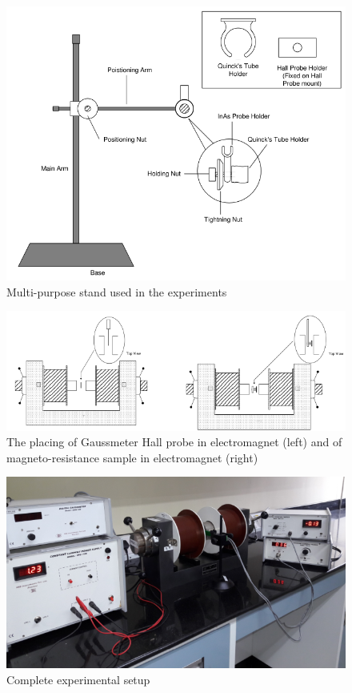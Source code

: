 \documentclass[%
 aip,
 amsmath,amssymb,
 reprint,%
]{revtex4-1}
\begin{document}
    \begin{figure}
        \centering
        \includegraphics[scale = 0.5]{Figures/stand.png}
        \caption{Multi-purpose stand used in the experiments}
        \label{fig:my_label}
    \end{figure}
    \begin{figure}
        \centering
        \includegraphics[scale = 0.5]{Figures/placing.png}
        \caption{The placing of Gaussmeter Hall probe in electromagnet (left) and of magneto-resistance sample in electromagnet (right)}
        \label{fig:my_label}
    \end{figure}
    \begin{figure}
        \centering
        \includegraphics[scale = 0.5]{Figures/expt-setup.png}
        \caption{Complete experimental setup}
        \label{fig:my_label}
    \end{figure}
\end{document}
